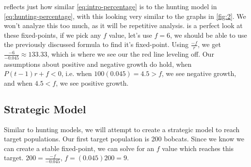 \documentclass{article}
\begin{document}
 reflects just how similar \cref{eq:intro-percentage} is to the hunting model in \cref{eq:hunting-percentage}, with this looking very similar to the graphs in \cref{fig:2}. We won't analyze this too much, as it will be repetitive analysis.  is a perfect look at these fixed-points, if we pick any $f$ value, let's use $f = 6$, we should be able to use the previously discussed formula to find it's fixed-point. Using $\frac{-f}{r}$, we get $\frac{-6}{-0.045} \approx 133.33$, which is where we see our the red line leveling off. Our assumptions about positive and negative growth do hold, when $P(t-1)r + f < 0$, i.e. when $100(0.045) = 4.5 > f$, we see negative growth, and when $4.5 < f$, we see positive growth.

\subsection{Strategic Model}
Similar to hunting models, we will attempt to create a strategic model to reach target populations. Our first target population is 200 bobcats. Since we know we can create a stable fixed-point, we can solve for an $f$ value which reaches this target. $200 = \frac{-f}{-0.045}$, $f = (0.045)200 = 9$.
\end{document}

